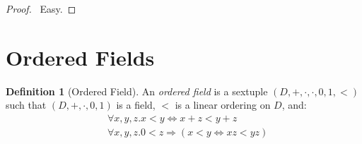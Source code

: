 \documentclass{article}
\let\qed\relax
\theoremstyle{definition}
\newtheorem{definition}[axiom]{Definition}
\begin{document}
    \begin{proof}
        \pf\ Easy. \qed
    \end{proof}
    
    \section{Ordered Fields}

    \begin{definition}[Ordered Field]
        An \emph{ordered field} is a sextuple $(D, +, \cdot, \cdot, 0, 1, <)$ such that $(D, +, \cdot, 0, 1)$
        is a field, $<$ is a linear ordering on $D$, and:
        \begin{align*}
            & \forall x,y,z. x < y \Leftrightarrow x + z < y + z \\
            & \forall x,y,z. 0 < z \Rightarrow (x < y \Leftrightarrow xz < yz)
        \end{align*}
    \end{definition}
\end{document}
